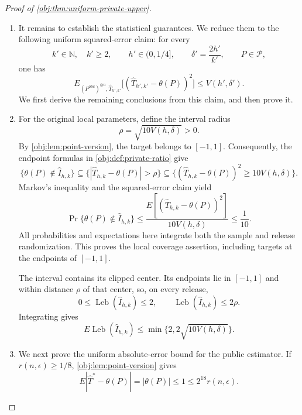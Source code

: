 \begin{proof}[Proof of \cref{obj:thm:uniform-private-upper}]
\begin{enumerate}
\item
It remains to establish the statistical guarantees. We reduce them to the following uniform squared-error claim: for every
\[
k'\in\mathbb N,\quad k'\ge2,
\qquad
h'\in(0,1/4],
\qquad
\delta'=\frac{2h'}{k'},
\qquad
P\in\mathcal P,
\]
one has
\[
E_{(P^{\mathrm{obs}})^{\otimes n},\widehat T_{h',k'}}
\bigl[(\widehat T_{h',k'}-\theta(P))^2\bigr]
\le V(h',\delta').
\]
We first derive the remaining conclusions from this claim, and then prove it.

\item
For the original local parameters, define the interval radius
\[
\rho=\sqrt{10V(h,\delta)}>0.
\]
By \cref{obj:lem:point-version}, the target belongs to \([-1,1]\). Consequently, the endpoint formulas in \cref{obj:def:private-ratio} give
\[
\{\theta(P)\notin\widehat I_{h,k}\}
\subseteq
\{|\widehat T_{h,k}-\theta(P)|>\rho\}
\subseteq
\{(\widehat T_{h,k}-\theta(P))^2\ge10V(h,\delta)\}.
\]
Markov's inequality and the squared-error claim yield
\[
\Pr\{\theta(P)\notin\widehat I_{h,k}\}
\le
\frac{
E[(\widehat T_{h,k}-\theta(P))^2]
}{10V(h,\delta)}
\le\frac1{10}.
\]
All probabilities and expectations here integrate both the sample and release randomization. This proves the local coverage assertion, including targets at the endpoints of \([-1,1]\).

The interval contains its clipped center. Its endpoints lie in \([-1,1]\) and within distance \(\rho\) of that center, so, on every release,
\[
0\le\operatorname{Leb}(\widehat I_{h,k})
\le2,
\qquad
\operatorname{Leb}(\widehat I_{h,k})\le2\rho.
\]
Integrating gives
\[
E\operatorname{Leb}(\widehat I_{h,k})
\le\min\{2,2\sqrt{10V(h,\delta)}\}.
\]

\item
We next prove the uniform absolute-error bound for the public estimator. If \(r(n,\epsilon)\ge1/8\), \cref{obj:lem:point-version} gives
\[
E|\widehat T^*-\theta(P)|
=|\theta(P)|
\le1
\le2^{18}r(n,\epsilon).
\]


\end{enumerate}
\end{proof}
